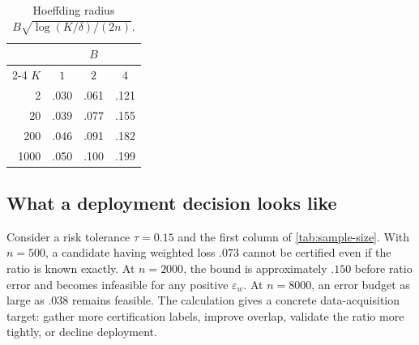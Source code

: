 \begin{table}[t]
\centering
\caption{Hoeffding radius $B\sqrt{\log(K/\delta)/(2n)}$.}
\label{tab:overlap}
\small
\setlength{\tabcolsep}{7pt}
\begin{tabular}{rccc}
\toprule
& \multicolumn{3}{c}{$B$} \\
\cmidrule(lr){2-4}
$K$ & $1$ & $2$ & $4$ \\
\midrule
   2 & .030 & .061 & .121 \\
  20 & .039 & .077 & .155 \\
 200 & .046 & .091 & .182 \\
1000 & .050 & .100 & .199 \\
\bottomrule
\end{tabular}
\end{table}

\subsection{What a deployment decision looks like}

Consider a risk tolerance $\tau=0.15$ and the first column of
\cref{tab:sample-size}.  With $n=500$, a candidate having weighted loss $.073$
cannot be certified even if the ratio is known exactly.  At $n=2000$, the bound is
approximately $.150$ before ratio error and becomes infeasible for any positive
$\varepsilon_w$.  At $n=8000$, an error budget as large as $.038$ remains feasible.
The calculation gives a concrete data-acquisition target: gather more certification
labels, improve overlap, validate the ratio more tightly, or decline deployment.
